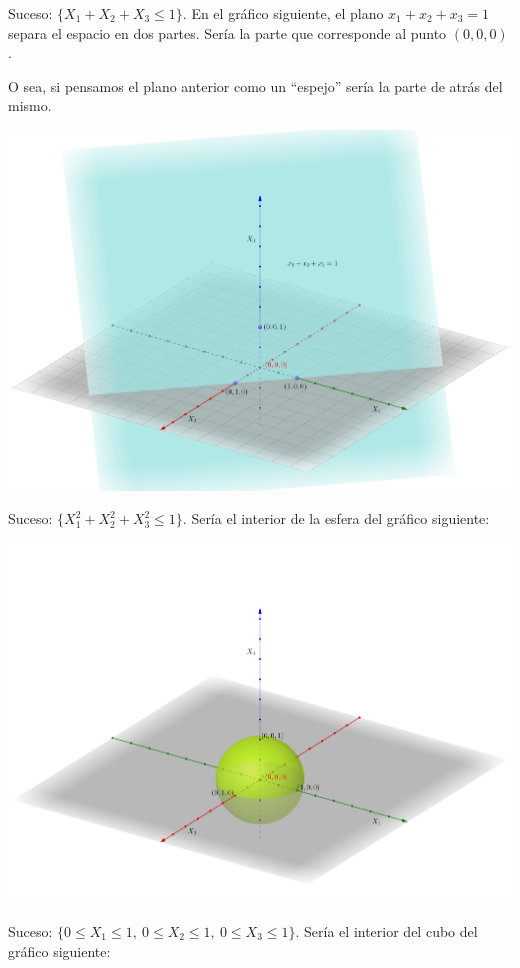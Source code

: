 \documentclass[]{book}
\begin{document}
Suceso: \(\{X_1+X_2+X_3\leq 1\}\). En el gráfico siguiente, el plano \(x_1+x_2+x_3=1\) separa el espacio en dos partes. Sería la parte que corresponde al punto \((0,0,0)\).

O sea, si pensamos el plano anterior como un ``espejo'' sería la parte de atrás del mismo.

\includegraphics{Images/EjPlano3D.png}

Suceso: \(\{X_1^2+X_2^2+X_3^2\leq 1\}\). Sería el interior de la esfera del gráfico siguiente:

\includegraphics{Images/EjEsfera3D.png}

Suceso: \(\{0\leq X_1\leq 1,\ 0\leq X_2\leq 1,\ 0\leq X_3\leq 1\}\). Sería el interior del cubo del gráfico siguiente:
\end{document}
